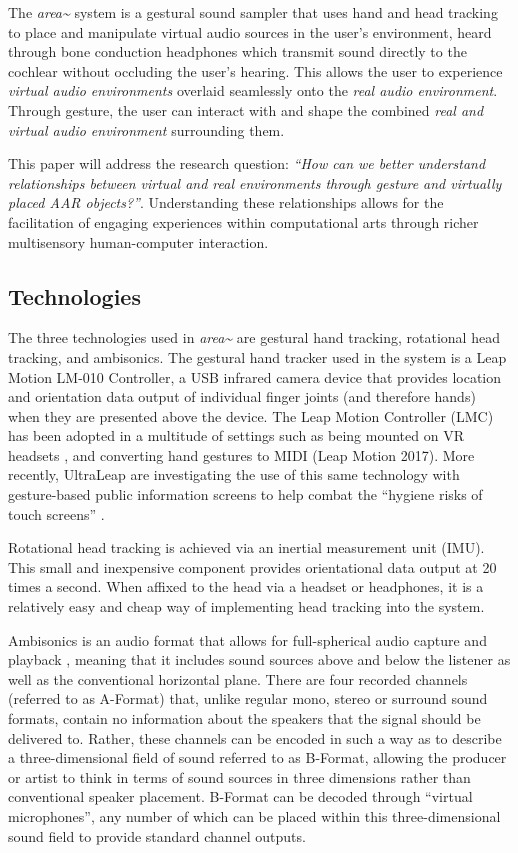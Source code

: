 The \textit{area\textasciitilde{}} system is a gestural sound sampler that uses hand and head tracking to place and manipulate virtual audio sources in the user’s environment, heard through bone conduction headphones which transmit sound directly to the cochlear without occluding the user’s hearing. This allows the user to experience \textit{virtual audio environments} overlaid seamlessly onto the \textit{real audio environment}. Through gesture, the user can interact with and shape the combined \textit{real and virtual audio environment} surrounding them.

This paper will address the research question: \textit{“How can we better understand relationships between virtual and real environments through gesture and virtually placed AAR objects?”}. Understanding these relationships allows for the facilitation of engaging experiences within computational arts through richer multisensory human-computer interaction.

\subsection{Technologies}                       \label{sec: area-intro-tech}
The three technologies used in \textit{area\textasciitilde{}} are gestural hand tracking, rotational head tracking, and ambisonics. The gestural hand tracker used in the system is a Leap Motion LM-010 Controller, a USB infrared camera device that provides location and orientation data output of individual finger joints (and therefore hands) when they are presented above the device. The Leap Motion Controller (LMC) has been adopted in a multitude of settings such as being mounted on VR headsets \citep{leapmotion2016}, and converting hand gestures to MIDI (Leap Motion 2017). More recently, UltraLeap are investigating the use of this same technology with gesture-based public information screens to help combat the “hygiene risks of touch screens” \citeyearpar{ultraleap2020a}.

Rotational head tracking is achieved via an inertial measurement unit (IMU). This small and inexpensive component provides orientational data output at 20 times a second. When affixed to the head via a headset or headphones, it is a relatively easy and cheap way of implementing head tracking into the system.

Ambisonics is an audio format that allows for full-spherical audio capture and playback \citep{gerzon1973}, meaning that it includes sound sources above and below the listener as well as the conventional horizontal plane. There are four recorded channels (referred to as A-Format) that, unlike regular mono, stereo or surround sound formats, contain no information about the speakers that the signal should be delivered to. Rather, these channels can be encoded in such a way as to describe a three-dimensional field of sound referred to as B-Format, allowing the producer or artist to think in terms of sound sources in three dimensions rather than conventional speaker placement. B-Format can be decoded through “virtual microphones”, any number of which can be placed within this three-dimensional sound field to provide standard channel outputs.

